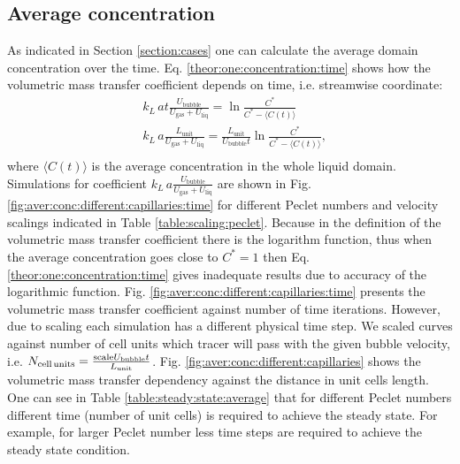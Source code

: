 \documentclass{article}
\newcommand{\beqal}{\begin{equation}\begin{aligned}}
\newcommand{\feqal}{\end{aligned}\end{equation}}
\newcommand{\vol}{k_L\,a}
\newcommand{\lunit}{L_{\mathrm{unit}}}
\newcommand{\ububble}{U_{\mathrm{bubble}}}
\newcommand{\uliq}{U_{\mathrm{liq}}}
\newcommand{\ugas}{U_{\mathrm{gas}}}
\newcommand{\cstar}{C^{*}}
\begin{document}
\subsection{Average concentration}
\label{main:results:periodic}
As indicated in Section \ref{section:cases} one can calculate the average domain concentration over
the time. Eq. \ref{theor:one:concentration:time} shows how 
the volumetric mass transfer coefficient depends on
time, i.e. streamwise coordinate:
\beqal
&\vol t \frac{\ububble}{\ugas+\uliq}=\ln\frac{\cstar}{\cstar-\langle C(t) \rangle}\\
&\vol \frac{\lunit}{\ugas+\uliq}=\frac{\lunit}{\ububble t} \ln \frac{C^*}{C^*-\langle C(t)
\rangle},\\
\feqal
where $\langle C(t) \rangle$ is the average concentration in the whole liquid domain.
Simulations for coefficient $\vol \frac{\ububble}{\ugas+\uliq}$ are shown in Fig.
\ref{fig:aver:conc:different:capillaries:time} for different Peclet numbers and velocity scalings
indicated in Table \ref{table:scaling:peclet}. Because in the definition of the volumetric mass
transfer coefficient there is the logarithm function, thus when the average concentration goes
close to $\cstar=1$ then Eq. \ref{theor:one:concentration:time} gives inadequate results due to
 accuracy of the logarithmic function. Fig. \ref{fig:aver:conc:different:capillaries:time} presents
the volumetric mass transfer coefficient against number of time iterations. However, due to scaling
each simulation has a different physical time step. We scaled curves against number of cell
units which tracer will pass with the given bubble velocity, i.e. 
$N_{\text{cell\,units}}=\frac{\text{scale} \ububble t}{\lunit}$.  Fig.
\ref{fig:aver:conc:different:capillaries} shows the volumetric mass transfer
dependency against the distance in unit cells length. One can see in Table
\ref{table:steady:state:average} that for different Peclet numbers different time (number of unit
cells) is required to achieve the steady state. For example, for
larger Peclet number less time steps are required to achieve the steady state condition. 
\end{document}

